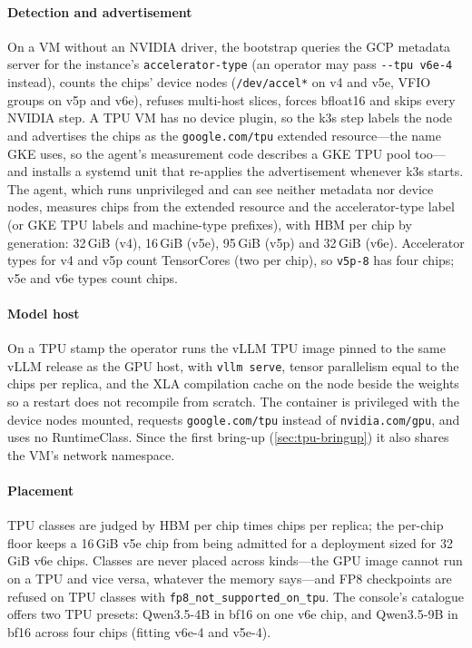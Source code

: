 \documentclass[conference,letterpaper]{IEEEtran}
\newcommand{\code}[1]{\texttt{\small #1}}
\begin{document}
\paragraph*{Detection and advertisement}
On a VM without an NVIDIA driver, the bootstrap queries the GCP metadata server for the
instance's \code{accelerator-type} (an operator may pass \code{-{}-tpu v6e-4} instead), counts
the chips' device nodes (\code{/dev/accel*} on v4 and v5e, VFIO groups on v5p and v6e),
refuses multi-host slices, forces bfloat16 and skips every NVIDIA step. A TPU VM has no
device plugin, so the k3s step labels the node and advertises the chips as the
\code{google.com/tpu} extended resource---the name GKE uses, so the agent's measurement code
describes a GKE TPU pool too---and installs a systemd unit that re-applies the advertisement
whenever k3s starts. The agent, which runs unprivileged and can see neither metadata nor
device nodes, measures chips from the extended resource and the accelerator-type label (or
GKE TPU labels and machine-type prefixes), with HBM per chip by generation: 32\,GiB (v4),
16\,GiB (v5e), 95\,GiB (v5p) and 32\,GiB (v6e). Accelerator types for v4 and v5p count
TensorCores (two per chip), so \code{v5p-8} has four chips; v5e and v6e types count chips.

\paragraph*{Model host}
On a TPU stamp the operator runs the vLLM TPU image pinned to the same vLLM release as the
GPU host, with \code{vllm serve}, tensor parallelism equal to the chips per replica, and the
XLA compilation cache on the node beside the weights so a restart does not recompile from
scratch. The container is privileged with the device nodes mounted, requests
\code{google.com/tpu} instead of \code{nvidia.com/gpu}, and uses no RuntimeClass. Since the
first bring-up (\cref{sec:tpu-bringup}) it also shares the VM's network namespace.

\paragraph*{Placement}
TPU classes are judged by HBM per chip times chips per replica; the per-chip floor keeps a
16\,GiB v5e chip from being admitted for a deployment sized for 32\,GiB v6e chips. Classes are
never placed across kinds---the GPU image cannot run on a TPU and vice versa, whatever the
memory says---and FP8 checkpoints are refused on TPU classes with
\code{fp8\_not\_supported\_on\_tpu}. The console's catalogue offers two TPU presets: Qwen3.5-4B
in bf16 on one v6e chip, and Qwen3.5-9B in bf16 across four chips (fitting v6e-4 and v5e-4).
\end{document}
